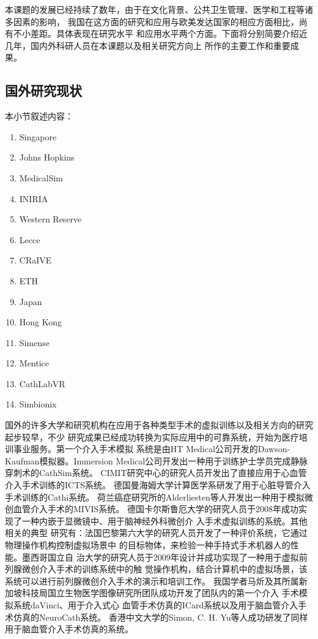 本课题的发展已经持续了数年，由于在文化背景、公共卫生管理、医学和工程等诸多因素的影响，
我国在这方面的研究和应用与欧美发达国家的相应方面相比，尚有不小差距。具体表现在研究水平
和应用水平两个方面。下面将分别简要介绍近几年，国内外科研人员在本课题以及相关研究方向上
所作的主要工作和重要成果。

\subsection{国外研究现状}

本小节叙述内容：
\begin{enumerate}
  \item Singapore
  \item Johns Hopkins
  \item MedicalSim
  \item INIRIA
  \item Western Reserve
  \item Lecce
  \item CRaIVE
  \item ETH
  \item Japan
  \item Hong Kong
  \item Simense
  \item Mentice
  \item CathLabVR
  \item Simbionix
\end{enumerate}

国外的许多大学和研究机构在应用于各种类型手术的虚拟训练以及相关方向的研究起步较早，不少
研究成果已经成功转换为实际应用中的可靠系统，开始为医疗培训事业服务。第一个介入手术模拟
系统是由HT Medical公司开发的Dawson-Kaufman模拟器\cite{meglan1996making}。Immersion
Medical公司开发出一种用于训练护士学员完成静脉穿刺术的CathSim系统\cite{ursino1999cathsim}。
CIMIT研究中心的研究人员开发出了直接应用于心血管介入手术训练的ICTS系统\cite{cotin2000icts}。
德国曼海姆大学计算医学系研发了用于心脏导管介入手术训练的Cathi系统\cite{hofer2002cathi}。
荷兰癌症研究所的Alderliesten等人开发出一种用于模拟微创血管介入手术的MIVIS系统\cite{alderliesten2004simulation}。
德国卡尔斯鲁厄大学的研究人员于2008年成功实现了一种内嵌于显微镜中、用于脑神经外科微创介
入手术虚拟训练的系统\cite{mauro2008development}\cite{mauro2009virtual}。其他相关的典型
研究有：法国巴黎第六大学的研究人员开发了一种评价系统，它通过物理操作机构控制虚拟场景中
的目标物体，来检验一种手持式手术机器人的性能\cite{zahraee2009evaluating}。墨西哥国立自
治大学的研究人员于2009年设计并成功实现了一种用于虚拟前列腺微创介入手术的训练系统中的触
觉操作机构，结合计算机中的虚拟场景，该系统可以进行前列腺微创介入手术的演示和培训工作\cite{padilla2009virtual}。
我国学者马炘及其所属新加坡科技局国立生物医学图像研究所团队成功开发了团队内的第一个介入
手术模拟系统daVinci\cite{wang1996potential}\cite{chui1996potential}、用于介入式心
血管手术仿真的ICard系统\cite{wang1999realtime}\cite{chui1998icard}以及用于脑血管介入手
术仿真的NeuroCath系统\cite{anderson2001pc}\cite{chui2002training}\cite{ma2004computer}\cite{ma2006customable}。
香港中文大学的Simon, C. H. Yu等人成功研发了同样用于脑血管介入手术仿真的系统\cite{cuhkweb}。

